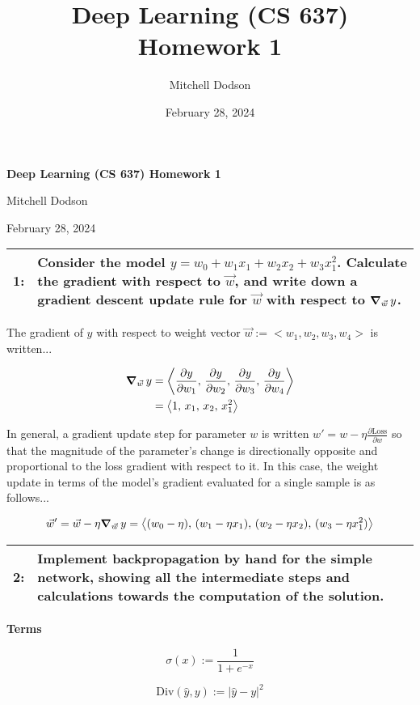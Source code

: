 \documentclass[12pt]{article}
\title{Deep Learning (CS 637) Homework 1}
\author{Mitchell Dodson}
\date{February 28, 2024}
\newcommand*{\problem}[2]{
    \begin{table}[ht]
    \centering
        \begin{tabular}{ | p{.1\linewidth} p{.9\linewidth} | }
            \hline
            \vspace{.3em}\textbf{\large#1:} & \vspace{.3em}\small{#2}\hspace{.2em}\vspace{.5em} \\ \hline
        \end{tabular}
    \end{table}
}
\begin{document}
\noindent
{\Large\textbf{Deep Learning (CS 637) Homework 1}}

\noindent
\large{Mitchell Dodson}

\noindent
\large{February 28, 2024}


\problem{1}{Consider the model $y=w_0 + w_1 x_1 + w_2 x_2 + w_3 x_1^2$. Calculate the gradient with respect to $\vec{w}$, and write down a gradient descent update rule for $\vec{w}$ with respect to $\grad_{\vec{w}}\, y$.}

The gradient of $y$ with respect to weight vector $\vec{w} := <w_1, w_2, w_3, w_4>$ is written...

\begin{equation}
    \begin{split}
        \grad_{\vec{w}} \, y &= \left<\frac{\partial y}{\partial w_1},\, \frac{\partial y}{\partial w_2},\, \frac{\partial y}{\partial w_3},\, \frac{\partial y}{\partial w_4}\right> \\
        &= \left< 1,\, x_1,\, x_2,\, x_1^2 \right> \\
    \end{split}
\end{equation}

In general, a gradient update step for parameter $w$ is written $w' = w - \eta \frac{\partial \text{Loss}}{\partial w}$ so that the magnitude of the parameter's change is directionally opposite and proportional to the loss gradient with respect to it. In this case, the weight update in terms of the model's gradient evaluated for a single sample is as follows...

\begin{equation}
        \vec{w}' = \vec{w} - \eta \grad_{\vec{w}} \, y = \left< (w_0 - \eta) ,\, (w_1 - \eta x_1) ,\, (w_2 - \eta x_2) ,\, (w_3 - \eta x_1^2) \right>
\end{equation}

\problem{2}{Implement backpropagation by hand for the simple network, showing all the intermediate steps and calculations towards the computation of the solution.}

\noindent
\textbf{Terms}

\begin{equation}
    \sigma(x) := \frac{1}{1+e^{-x}}
\end{equation}

\begin{equation}
    \text{Div}(\hat{y}, y) := |\hat{y} - y|^2
\end{equation}
\end{document}
